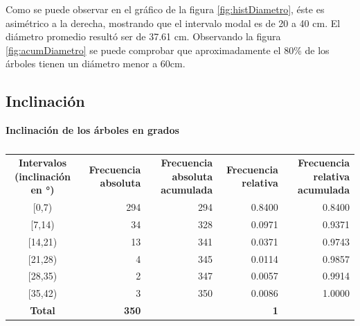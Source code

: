 \documentclass[11pt]{article}
\begin{document}
\begin{justify}
  Como se puede observar en el gráfico de la figura \ref{fig:histDiametro}, 
  éste es asimétrico a la derecha, mostrando que el intervalo modal
  es de 20 a 40 cm. El diámetro promedio resultó ser 
  de 37.61 cm. Observando la figura
  \ref{fig:acumDiametro} se puede comprobar que aproximadamente el 80\%
  de los árboles tienen un diámetro menor a 60cm.
\end{justify}


\subsection{Inclinación}

\begin{table}[h!]
  \begin{center}
    \caption*{\textbf{Inclinación de los árboles en grados}}
    \begin{tabular}{| c | r | r | r | r |}
      \hline
      \multirow{3}{3cm}{\centering\textbf{Intervalos (inclinación en °)}} & 
      \multirow{3}{2.5cm}{\centering\textbf{Frecuencia absoluta}} & 
      \multirow{3}{2.5cm}{\centering\textbf{Frecuencia absoluta acumulada}} &
      \multirow{3}{2.5cm}{\centering\textbf{Frecuencia relativa}} & 
      \multirow{3}{2.5cm}{\centering\textbf{Frecuencia relativa acumulada}} \\
      & & & & \\
      & & & & \\ \hline
      [0,7) & 294 & 294 & 0.8400 & 0.8400 \\ \hline
      [7,14) & 34 & 328 & 0.0971 & 0.9371 \\ \hline
      [14,21) & 13 & 341 & 0.0371 & 0.9743 \\ \hline
      [21,28) & 4 & 345 & 0.0114 & 0.9857 \\ \hline
      [28,35) & 2 & 347 & 0.0057 & 0.9914 \\ \hline
      [35,42) & 3 & 350 & 0.0086 & 1.0000 \\ \hline
      \textbf{Total} & \textbf{350} & & \textbf{1} & \\ \hline
    \end{tabular}
    \caption{}
    \label{tab:tablaInclinacion}
  \end{center}
\end{table}
\end{document}
